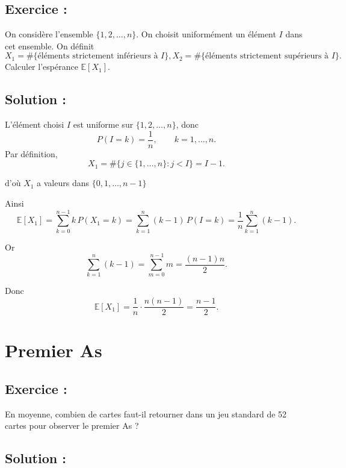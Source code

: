 \subsection*{Exercice :}

\begin{exerciseBox}
On considère l’ensemble $\{1,2,\dots,n\}$.  
On choisit uniformément un élément $I$ dans cet ensemble.  
On définit
\[
X_1 = \#\{\text{éléments strictement inférieurs à } I\},
X_2 = \#\{\text{éléments strictement supérieurs à } I\}.
\]
Calculer l’espérance $\mathbb{E}[X_1]$.
\end{exerciseBox}


\subsection*{Solution :}

L’élément choisi $I$ est uniforme sur $\{1,2,\dots,n\}$, donc
\[
P(I = k) = \frac{1}{n}, \qquad k=1,\dots,n.
\]
Par définition,
\[
X_1 = \#\{j \in \{1,\dots,n\} : j < I\} = I - 1.
\]

d'où $X_1$ a valeurs dans $\{0,1,\dots,n-1\}$

Ainsi
\[
\mathbb{E}[X_1]
= \sum_{k=0}^{n-1} k \, P(X_1=k) 
= \sum_{k=1}^{n} (k-1) \, P(I=k) 
= \frac{1}{n} \sum_{k=1}^n (k-1).
\]



Or
\[
\sum_{k=1}^n (k-1) = \sum_{m=0}^{\,n-1} m
= \frac{(n-1)n}{2}.
\]

Donc
\[
\mathbb{E}[X_1]
= \frac{1}{n} \cdot \frac{n(n-1)}{2}
= \boxed{\displaystyle \frac{n-1}{2}}.
\]




\section{Premier As}

\subsection*{Exercice :}

\begin{exerciseBox}[Premier As]
En moyenne, combien de cartes faut-il retourner dans un jeu standard de 52 cartes
pour observer le premier As ?
\end{exerciseBox}

\subsection*{Solution :}

